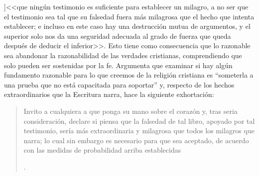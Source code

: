 ]{<<que ningún testimonio es suficiente para establecer un milagro, a no ser que el testimonio sea tal que su falsedad fuera más milagrosa que el hecho que intenta establecer; e incluso en este caso hay una destrucción mutua de argumentos, y el superior solo nos da una seguridad adecuada al grado de fuerza que queda después de deducir el inferior>>}.
\label{subsec:humarg}
Esto tiene como consecuencia que lo razonable sea abandonar la razonabilidad de las verdades cristianas, comprendiendo que solo pueden ser sostenidas por la fe. Argumenta que examinar si hay algún fundamento razonable para lo que creemos de la religión cristiana es \enquote{someterla a una prueba que no está capacitada para soportar} y, respecto de los hechos extraordinarios que la Escritura narra, hace la siguiente exhortación: \blockquote[{\Cite[\S10,2. 157-158]{hume1777enquiryes}}.]{Invito a cualquiera a que ponga su mano sobre el corazón y, tras seria consideración, declare si piensa que la falsedad de tal libro, apoyado por tal testimonio, sería más extraordinaria y milagrosa que todos los milagros que narra; lo cual sin embargo es necesario para que sea aceptado, de acuerdo con las medidas de probabilidad arriba establecidas}.
